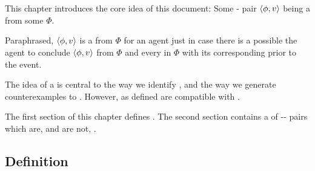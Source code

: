 \chapter{}
\label{cha:fcs}

\nocite{Ryle:1946tu}



\begin{note}
  This chapter introduces the core idea of this document:
  Some - pair \(\langle\phi, v\rangle\) being a \emph{\fc{}} from some  \(\Phi\).

  Paraphrased, \(\langle\phi, v\rangle\) is a \fc{} from \(\Phi\) for an agent just in case there is a possible  the agent to conclude \(\langle\phi, v\rangle\) from \(\Phi\) and \evals{} every \prop{} in \(\Phi\) with its corresponding \val{} prior to the event.
\end{note}

\begin{note}
  The idea of a  is central to the way we identify , and the way we generate counterexamples to \issueInclusion{}.
  However,  as defined are compatible with \issueInclusion{}.
\end{note}

\begin{note}
  The first section of this chapter defines .
  The second section contains a  of -- pairs which are, and are not, .
\end{note}

\section{Definition}
\label{cha:fcs:def}

